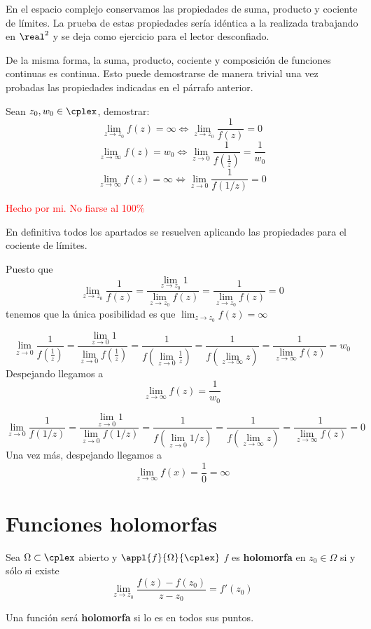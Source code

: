\documentclass{apuntes}
\begin{document}
En el espacio complejo conservamos las propiedades de suma, producto y cociente de límites. La prueba de estas propiedades sería idéntica a la realizada trabajando en $\real^2$ y se deja como ejercicio para el lector desconfiado.

De la misma forma, la suma, producto, cociente y composición de funciones continuas es continua. Esto puede demostrarse de manera trivial una vez probadas las propiedades indicadas en el párrafo anterior.

\begin{problem}[1]
Sean $z_0, w_0 \in \cplex$, demostrar:
\ppart \[\lim_{z\to z_0} f(z) = \infty \iff \lim_{z\to z_0}\frac{1}{f(z)}=0\]
\ppart \[\lim_{z\to \infty} f(z) = w_0 \iff \lim_{z\to 0}\frac{1}{f(\frac{1}{z})}=\frac{1}{w_0}\]
\ppart \[\lim_{z\to \infty} f(z) = \infty \iff \lim_{z\to 0}\frac{1}{f(1/z)}=0\]

\solution
\textcolor{red}{Hecho por mi. No fiarse al 100\%}

En definitiva todos los apartados se resuelven aplicando las propiedades para el cociente de límites.

\spart
Puesto que
\[\lim_{z\to z_0}\frac{1}{f(z)}=\frac{\lim_{z\to z_0}1}{\lim_{z\to z_0}f(z)}=\frac{1}{\lim_{z\to z_0}f(z)}=0\]
tenemos que la única posibilidad es que $\lim_{z\to z_0}f(z)=\infty$

\spart
\[\lim_{z\to 0}\frac{1}{f(\frac{1}{z})}=\frac{\lim_{z\to 0}1}{\lim_{z\to 0}f(\frac{1}{z})}=\frac{1}{f(\lim_{z\to 0}\frac{1}{z})}=\frac{1}{f(\lim_{z\to \infty}z)}=\frac{1}{\lim_{z\to \infty}f(z)}=w_0\]
Despejando llegamos a
\[\lim_{z\to \infty}f(z)=\frac{1}{w_0}\]

\spart
\[\lim_{z\to 0}\frac{1}{f(1/z)}=\frac{\lim_{z\to 0}1}{\lim_{z\to 0}f(1/z)}=\frac{1}{f(\lim_{z\to 0}1/z)} = \frac{1}{f(\lim_{z\to \infty}z)} = \frac{1}{\lim_{z\to \infty}f(z)}=0\]
Una vez más, despejando llegamos a
\[\lim_{z\to \infty} f(x) = \frac{1}{0}=\infty\]
\end{problem}


\chapter{Funciones holomorfas}
\begin{defn}
Sea $\Omega \subset \cplex$ abierto y $\appl{f}{\Omega}{\cplex}$ $f$ es \textbf{holomorfa} en $z_0 \in \Omega$ si y sólo si existe
\[\lim_{z\to z_0} \frac{f(z)-f(z_0)}{z-z_0}= f'(z_0)\]

Una función será \textbf{holomorfa} si lo es en todos sus puntos.
\end{defn}
\end{document}
